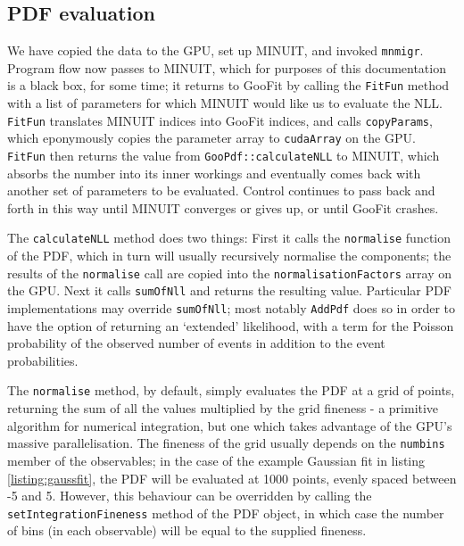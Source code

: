 \documentclass[12pt,pdflatex]{article}
\begin{document}
\subsection{PDF evaluation}

We have copied the data to the GPU, set up MINUIT, and invoked \texttt{mnmigr}. 
Program flow now passes to MINUIT, which for purposes of this documentation
is a black box, for some time; it returns to GooFit by calling the \texttt{FitFun}
method with a list of parameters for which MINUIT would like us to evaluate the NLL. 
\texttt{FitFun} translates MINUIT indices into GooFit indices, and calls \texttt{copyParams}, 
which eponymously copies the parameter array to \texttt{cudaArray} on the GPU. 
\texttt{FitFun} then returns the value from \texttt{GooPdf::calculateNLL}
to MINUIT, which absorbs the number into its inner workings and eventually comes
back with another set of parameters to be evaluated. Control continues to pass back
and forth in this way until MINUIT converges or gives up, or until GooFit crashes. 

The \texttt{calculateNLL} method does two things: First it calls the \texttt{normalise}
function of the PDF, which in turn will usually recursively normalise the components;
the results of the \texttt{normalise} call are copied into the \texttt{normalisationFactors}
array on the GPU. Next it calls \texttt{sumOfNll} and returns the resulting value.
Particular PDF implementations may override \texttt{sumOfNll}; most notably
\texttt{AddPdf} does so in order to have the option of returning
an `extended' likelihood, with a term for the Poisson probability of the observed
number of events in addition to the event probabilities. 

The \texttt{normalise} method, by default, simply evaluates the PDF at a grid of points,
returning the sum of all the values multiplied by the grid fineness - a primitive algorithm
for numerical integration, but one which takes advantage of the GPU's massive parallelisation.
The fineness of the grid usually depends on the \texttt{numbins} member of the observables; in
the case of the example Gaussian fit in listing \ref{listing:gaussfit}, the PDF will be evaluated at 1000 points, evenly
spaced between -5 and 5. However, this behaviour can be overridden by calling the 
\texttt{setIntegrationFineness} method of the PDF object, in which case the number of bins
(in each observable) will be equal to the supplied fineness. 
\end{document}
